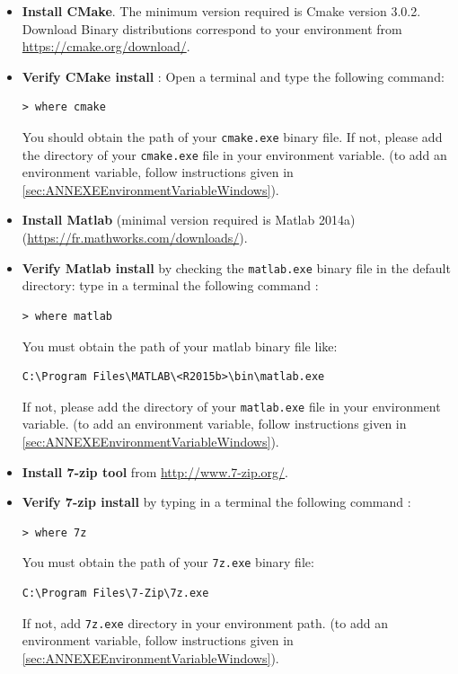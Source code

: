 \begin{itemize}
\item \textbf{Install CMake}. The minimum version required is Cmake version 3.0.2. Download Binary distributions correspond to your environment from \url{https://cmake.org/download/}.
\item \textbf{Verify CMake install} : Open a terminal and type the following command:
\begin{lstlisting}
> where cmake
\end{lstlisting}
You should obtain the path of your \texttt{cmake.exe} binary file. If not, please add the directory of your \texttt{cmake.exe} file in your environment variable. (to add an environment variable, follow instructions given in \ref{sec:ANNEXEEnvironmentVariableWindows}). 

\item \textbf{Install Matlab} (minimal version required is Matlab 2014a) (\url{https://fr.mathworks.com/downloads/}). 

\item \textbf{Verify Matlab install} by checking the \texttt{matlab.exe} binary file in the default directory:  type in a terminal the following command : 
\begin{lstlisting}
> where matlab
\end{lstlisting}
You must obtain the path of your matlab binary file like: 
\begin{lstlisting}[backgroundcolor=\color{white}]
C:\Program Files\MATLAB\<R2015b>\bin\matlab.exe
\end{lstlisting}
If not, please add the directory of your \texttt{matlab.exe} file in your environment variable. (to add an environment variable, follow instructions given in \ref{sec:ANNEXEEnvironmentVariableWindows}). 


\item \textbf{Install 7-zip tool} from \url{http://www.7-zip.org/}. 

\item \textbf{Verify 7-zip install} by typing in a terminal the following command : 
\begin{lstlisting}
> where 7z
\end{lstlisting}
You must obtain the path of your \texttt{7z.exe} binary file: 
\begin{lstlisting}[backgroundcolor=\color{white}]
C:\Program Files\7-Zip\7z.exe
\end{lstlisting}
If not, add \texttt{7z.exe} directory in your environment path. 
(to add an environment variable, follow instructions given in \ref{sec:ANNEXEEnvironmentVariableWindows}). 

\end{itemize}

